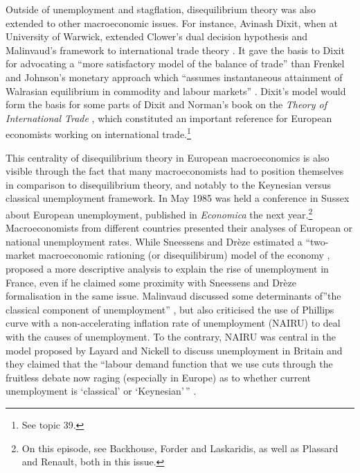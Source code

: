 \documentclass[]{elsarticle} %
\begin{document}
Outside of unemployment and stagflation, disequilibrium theory was also
extended to other macroeconomic issues. For instance, Avinash Dixit,
when at University of Warwick, extended Clower's
\citeyearpar{clower1965} dual decision hypothesis and Malinvaud's
framework to international trade theory \citep[393]{dixit1978}. It gave
the basis to Dixit for advocating a ``more satisfactory model of the
balance of trade'' than Frenkel and Johnson's \citeyearpar{frenkel1976}
monetary approach which ``assumes instantaneous attainment of Walrasian
equilibrium in commodity and labour markets'' \citep[393]{dixit1978}.
Dixit's model would form the basis for some parts of Dixit and Norman's
book on the \emph{Theory of International Trade} \citep{dixit1980},
which constituted an important reference for European economists working
on international trade.\footnote{See topic 39.}

This centrality of disequilibrium theory in European macroeconomics is
also visible through the fact that many macroeconomists had to position
themselves in comparison to disequilibrium theory, and notably to the
Keynesian versus classical unemployment framework. In May 1985 was held
a conference in Sussex about European unemployment, published in
\emph{Economica} the next year.\footnote{On this episode, see Backhouse,
  Forder and Laskaridis, as well as Plassard and Renault, both in this
  issue.} Macroeconomists from different countries presented their
analyses of European or national unemployment rates. While Sneessens and
Drèze estimated a ``two-market macroeconomic rationing (or
disequilibirum) model of the economy \citep[S97]{sneessens1986},
\citet{malinvaud1986} proposed a more descriptive analysis to explain
the rise of unemployment in France, even if he claimed some proximity
with Sneessens and Drèze formalisation in the same issue. Malinvaud
discussed some determinants of''the classical component of
unemployment'' \citep[S216]{malinvaud1986}, but also criticised the use
of Phillips curve with a non-accelerating inflation rate of unemployment
(NAIRU) to deal with the causes of unemployment. To the contrary, NAIRU
was central in the model proposed by Layard and Nickell to discuss
unemployment in Britain and they claimed that the ``labour demand
function that we use cuts through the fruitless debate now raging
(especially in Europe) as to whether current unemployment is `classical'
or `Keynesian'\,'' \citep[S121]{layard1986}.
\end{document}
